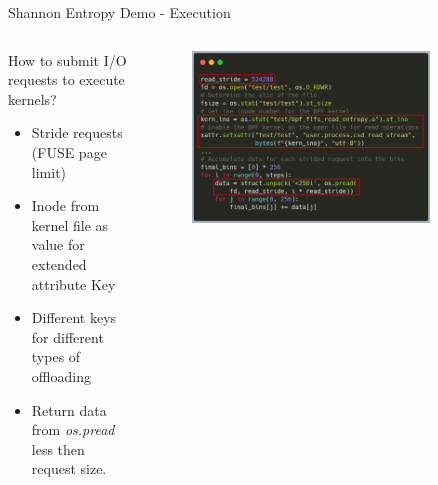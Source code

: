\documentclass[aspectratio=169, notes]{beamer}
\begin{document}
\begin{frame}{Shannon Entropy Demo - Execution}
    \begin{columns}
        \begin{column}{0.40\textwidth}
            \footnotesize
            How to submit I/O requests to execute kernels?
            \begin{itemize}
                \item Stride requests (FUSE page limit)
                \item Inode from kernel file as value for extended attribute
                      Key
                \item Different keys for different types of offloading
                \item Return data from \textit{os.pread} less then request
                      size.
            \end{itemize}
        \end{column}
        \begin{column}{0.60\textwidth}
            \begingroup
            \small
            \begin{figure}
                \centering
                \includegraphics[width=0.85\textwidth]{resources/images/python-kernel-carbon2.png}
            \end{figure}
            \endgroup
        \end{column}
    \end{columns}
\end{frame}
\end{document}
